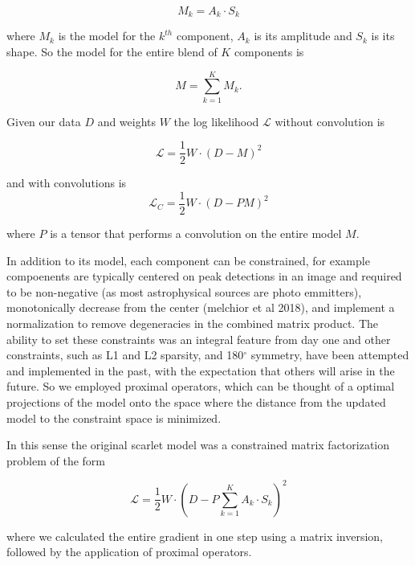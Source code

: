 \documentclass[DM,authoryear,toc]{lsstdoc}
\begin{document}
\begin{equation}
M_k = A_k \cdot S_k \label{eq:single_model}
\end{equation}

where $M_k$ is the model for the $k^{th}$ component, $A_k$ is its amplitude and $S_k$ is its shape. So the model for the entire blend of $K$ components is

\begin{equation}
  M = \sum_{k=1}^{K}{M_k}. \label{eq:combined_model}
\end{equation}

Given our data $D$ and weights $W$ the log likelihood $\mathcal{L}$ without convolution is

\begin{equation}
  \mathcal{L} = \frac{1}{2}W\cdot(D-M)^2 \label{eq:simple_logL}
\end{equation}

and with convolutions is
\begin{equation}
  \mathcal{L}_C = \frac{1}{2}W\cdot(D-PM)^2 \label{eq:comvolved_logL}
\end{equation}

where $P$ is a tensor that performs a convolution on the entire model $M$.

In addition to its model, each component can be constrained, for example compoenents are typically centered on peak detections in an image and required to be non-negative (as most astrophysical sources are photo emmitters), monotonically decrease from the center (melchior et al 2018), and implement a normalization to remove degeneracies in the combined matrix product. The ability to set these constraints was an integral feature from day one and other constraints, such as L1 and L2 sparsity, and 180$^\circ$ symmetry, have been attempted and implemented in the past, with the expectation that others will arise in the future. So we employed proximal operators, which can be thought of a optimal projections of the model onto the space where the distance from the updated model to the constraint space is minimized.

In this sense the original scarlet model was a constrained matrix factorization problem of the form

\begin{equation}
  \mathcal{L} = \frac{1}{2}W\cdot(D-P\sum_{k=1}^{K}{A_k\cdot S_k})^2 \label{eq:old_logL}
\end{equation}

where we calculated the entire gradient in one step using a matrix inversion, followed by the application of proximal operators.
\end{document}
